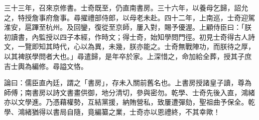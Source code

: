 \begin{pinyinscope}
三十三年，召來京修書。士奇既至，仍直南書房。三十六年，以養母乞歸，詔允之，特授詹事府詹事。尋擢禮部侍郎，以母老未赴。四十二年，上南巡，士奇迎駕淮安，扈蹕至杭州。及回鑾，復從至京師，屢入對，賜予優渥。上顧侍臣曰：「朕初讀書，內監授以四子本經，作時文；得士奇，始知學問門徑。初見士奇得古人詩文，一覽即知其時代，心以為異，未幾，朕亦能之。士奇無戰陣功，而朕待之厚，以其裨朕學問者大也。」尋遣歸，是年卒於家。上深惜之，命加給全葬，授其子庶吉士輿為編修。尋謚文恪。

論曰：儒臣直內廷，謂之「書房」，存未入關前舊名也。上書房授諸皇子讀，尊為師傅；南書房以詩文書畫供御，地分清切，參與密勿。乾學、士奇先後入直，鴻緒亦以文學進。乃憑藉權勢，互結黨援，納賄營私，致屢遭彈劾，聖祖曲予保全。乾學、鴻緒猶得以書局自隨，竟編纂之業，士奇亦以恩禮終，不其幸歟！


\end{pinyinscope}